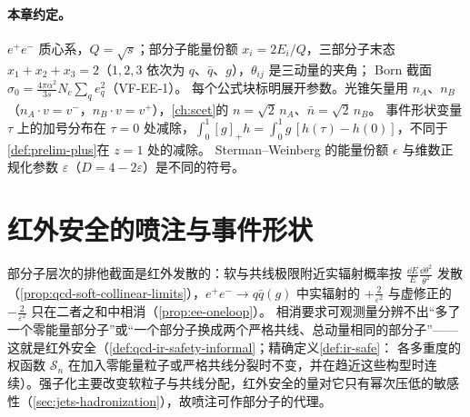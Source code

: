 \paragraph{本章约定。}
$e^+e^-$ 质心系，$Q=\sqrt s$；部分子能量份额 $x_i=2E_i/Q$，三部分子末态 $x_1+x_2+x_3=2$（$1,2,3$ 依次为 $q$、$\bar q$、$g$），$\theta_{ij}$ 是三动量的夹角；
Born 截面 $\sigma_0=\frac{4\pi\alpha^2}{3s}N_c\sum_qe_q^2$（VF-EE-1）。%
每个公式块标明展开参数。光锥矢量用 $n_A$、$n_B$（$n_A\cdot v=v^-$，$n_B\cdot v=v^+$），\cref{ch:scet}的 $n=\sqrt2\,n_A$、$\bar n=\sqrt2\,n_B$。
事件形状变量 $\tau$ 上的加号分布在 $\tau=0$ 处减除，$\int_0^1[g]_+h=\int_0^1g\,[h(\tau)-h(0)]$，不同于\cref{def:prelim-plus}在 $z=1$ 处的减除。
Sterman--Weinberg 的能量份额 $\epsilon$ 与维数正规化参数 $\varepsilon$（$D=4-2\varepsilon$）是不同的符号。
\section{红外安全的喷注与事件形状}\label{sec:jets-irsafe}

部分子层次的排他截面是红外发散的：软与共线极限附近实辐射概率按 $\frac{\dd E}{E}\frac{\dd\theta^2}{\theta^2}$ 发散（\cref{prop:qcd-soft-collinear-limits}），$e^+e^-\to q\bar q(g)$ 中实辐射的 $+\frac{2}{\varepsilon^2}$ 与虚修正的 $-\frac{2}{\varepsilon^2}$ 只在二者之和中相消（\cref{prop:ee-oneloop}）。
相消要求可观测量分辨不出“多了一个零能量部分子”或“一个部分子换成两个严格共线、总动量相同的部分子”——这就是红外安全（\cref{def:qcd-ir-safety-informal}；精确定义\cref{def:ir-safe}：
各多重度的权函数 $\mathcal S_n$ 在加入零能量粒子或严格共线分裂时不变，并在趋近这些构型时连续）。强子化主要改变软粒子与共线分配，红外安全的量对它只有幂次压低的敏感性（\cref{sec:jets-hadronization}），故喷注可作部分子的代理。

